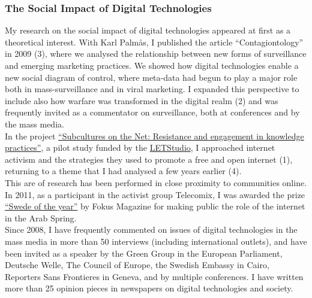 \documentclass[a4paper,11pt,oneside]{article}
\begin{document}
    \subsubsection{The Social Impact of Digital Technologies}
    My research on the social impact of digital technologies appeared at first as a theoretical
    interest. With Karl Palmås, I published the article ``Contagiontology'' in 2009 (3),
    where we analysed the relationship between new forms of surveillance and emerging
    marketing practices. We showed how digital technologies enable a new social diagram
    of control, where meta-data had begun to play a major role both in mass-surveillance
    and in viral marketing. I expanded this perspective to include also how warfare
    was transformed in the digital realm (2) and was frequently invited as a commentator
    on surveillance, both at conferences and by the mass media.\\

    In the project \href{http://letstudio.gu.se/studio-2/subcultures-on-the-net}{``Subcultures on the Net: Resistance and engagement in knowledge practices''},
    a pilot study funded by the \href{http://letstudio.gu.se/}{LETStudio}, I
    approached internet activism and the strategies they used to promote a free and
    open internet (1), returning to a theme that I had analysed a few years earlier (4).\\

    This are of research has been performed in close proximity to communities online.
    In 2011, as a participant in the activist group Telecomix, I was
    awarded the prize \href{http://www.fokus.se/2011/12/med-datorn-som-vapen/}{``Swede of the year''} by Fokus Magazine
    for making public the role of the internet in the Arab Spring. \\

    Since 2008, I have frequently commented on issues of digital technologies
    in the mass media in more than 50 interviews (including international outlets), and have been invited as a speaker by
    the Green Group in the European Parliament, Deutsche Welle, The Council of Europe,
    the Swedish Embassy in Cairo, Reporters Sans Frontieres in Geneva, and by multiple conferences.
    I have written more than 25 opinion pieces in newspapers on digital technologies and society.\\
\end{document}
